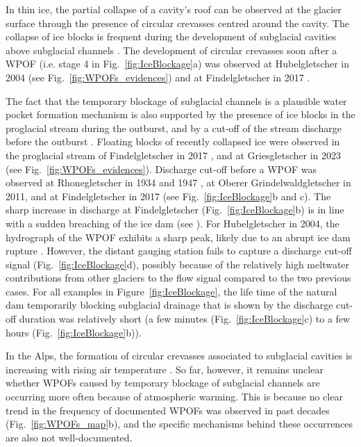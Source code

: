 In thin ice, the partial collapse of a cavity's roof can be observed at the glacier surface through the presence of circular crevasses centred around the cavity. The collapse of ice blocks is frequent during the development of subglacial cavities above subglacial channels \citep{Egli&al2021, Ogier&al2022}. The development of circular crevasses soon after a WPOF (i.e. stage 4 in Fig.~\ref{fig:IceBlockage}a) was observed at Hubelgletscher in 2004 (see Fig.~\ref{fig:WPOFs_evidences}) and at Findelgletscher in 2017 .  

The fact that the temporary blockage of subglacial channels is a plausible water pocket formation mechanism is also supported by the presence of ice blocks in the proglacial stream during the outburst, and by a cut-off of the stream discharge before the outburst \citep[as described in][]{Ballantyne&McGann1980}. Floating blocks of recently collapsed ice were observed in the proglacial stream of Findelgletscher in 2017 \citep{Swift&al2021}, and at Griesgletscher in 2023 (see Fig.~\ref{fig:WPOFs_evidences}). Discharge cut-off before a WPOF was observed at Rhonegletscher in 1934 and 1947 \citep{Mercanton1948}, at Oberer Grindelwaldgletscher in 2011, and at Findelgletscher in 2017 (see Fig.~\ref{fig:IceBlockage}b and c). The sharp increase in discharge at Findelgletscher (Fig.~\ref{fig:IceBlockage}b) is in line with a sudden breaching of the ice dam (see \cite{Haeberli1983}). For Hubelgletscher in 2004, the hydrograph of the WPOF exhibits a sharp peak, likely due to an abrupt ice dam rupture \citep{fink2004}. However, the distant gauging station fails to capture a discharge cut-off signal (Fig.~\ref{fig:IceBlockage}d), possibly because of the relatively high meltwater contributions from other glaciers to the flow signal compared to the two previous cases. For all examples in Figure~\ref{fig:IceBlockage}, the life time of the natural dam temporarily blocking subglacial drainage that is shown by the discharge cut-off duration was relatively short (a few minutes (Fig.~\ref{fig:IceBlockage}c) to a few hours (Fig.~\ref{fig:IceBlockage}b)). 

In the Alps, the formation of circular crevasses associated to subglacial cavities is increasing with rising air temperature \citep{Stocker&al2017,Egli&al2021}. So far, however, it remains unclear whether WPOFs caused by temporary blockage of subglacial channels are occurring more often because of atmospheric warming. This is because no clear trend in the frequency of documented WPOFs was observed in past decades (Fig.~\ref{fig:WPOFs_map}b), and the specific mechanisms behind these occurrences are also not well-documented.

